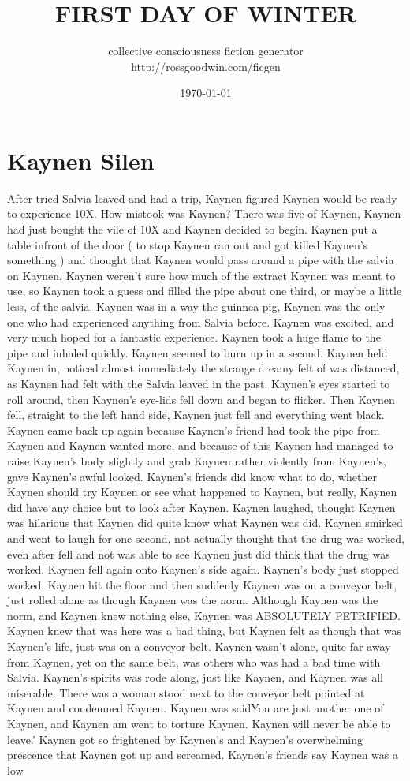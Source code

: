 \documentclass[12pt]{book}
\title{FIRST DAY OF WINTER }
\author{collective consciousness fiction generator\\http://rossgoodwin.com/ficgen}
\date{\today}
\begin{document}
\maketitle



\chapter{Kaynen Silen}

After tried Salvia leaved and had a trip, Kaynen figured Kaynen would be ready to experience 10X. How mistook was Kaynen? There was five of Kaynen, Kaynen had just bought the vile of 10X and Kaynen decided to begin. Kaynen put a table infront of the door ( to stop Kaynen ran out and got killed Kaynen's something ) and thought that Kaynen would pass around a pipe with the salvia on Kaynen. Kaynen weren't sure how much of the extract Kaynen was meant to use, so Kaynen took a guess and filled the pipe about one third, or maybe a little less, of the salvia. Kaynen was in a way the guinnea pig, Kaynen was the only one who had experienced anything from Salvia before. Kaynen was excited, and very much hoped for a fantastic experience. Kaynen took a huge flame to the pipe and inhaled quickly. Kaynen seemed to burn up in a second. Kaynen held Kaynen in, noticed almost immediately the strange dreamy felt of was distanced, as Kaynen had felt with the Salvia leaved in the past. Kaynen's eyes started to roll around, then Kaynen's eye-lids fell down and began to flicker. Then Kaynen fell, straight to the left hand side, Kaynen just fell and everything went black. Kaynen came back up again because Kaynen's friend had took the pipe from Kaynen and Kaynen wanted more, and because of this Kaynen had managed to raise Kaynen's body slightly and grab Kaynen rather violently from Kaynen's, gave Kaynen's awful looked. Kaynen's friends did know what to do, whether Kaynen should try Kaynen or see what happened to Kaynen, but really, Kaynen did have any choice but to look after Kaynen. Kaynen laughed, thought Kaynen was hilarious that Kaynen did quite know what Kaynen was did. Kaynen smirked and went to laugh for one second, not actually thought that the drug was worked, even after fell and not was able to see Kaynen just did think that the drug was worked. Kaynen fell again onto Kaynen's side again. Kaynen's body just stopped worked. Kaynen hit the floor and then suddenly Kaynen was on a conveyor belt, just rolled alone as though Kaynen was the norm. Although Kaynen was the norm, and Kaynen knew nothing else, Kaynen was ABSOLUTELY PETRIFIED. Kaynen knew that was here was a bad thing, but Kaynen felt as though that was Kaynen's life, just was on a conveyor belt. Kaynen wasn't alone, quite far away from Kaynen, yet on the same belt, was others who was had a bad time with Salvia. Kaynen's spirits was rode along, just like Kaynen, and Kaynen was all miserable. There was a woman stood next to the conveyor belt pointed at Kaynen and condemned Kaynen. Kaynen was saidYou are just another one of Kaynen, and Kaynen am went to torture Kaynen. Kaynen will never be able to leave.' Kaynen got so frightened by Kaynen's and Kaynen's overwhelming prescence that Kaynen got up and screamed. Kaynen's friends say Kaynen was a low 
\end{document}
